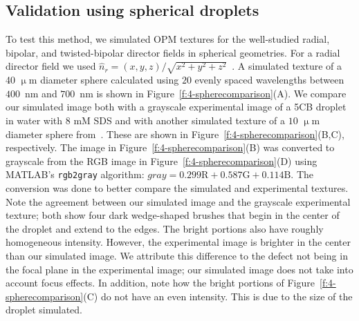 \subsection{Validation using spherical droplets}
To test this method, we simulated OPM textures for the well-studied radial, bipolar, and twisted-bipolar director fields in spherical geometries.
For a radial director field we used $\hat{n}_r = (x,y,z)/\sqrt{x^2+y^2+z^2}$~\cite{RN232}.
A simulated texture of a 40 $\upmu$m diameter sphere calculated using $20$ evenly spaced wavelengths between $400$~nm and $700$~nm is shown in Figure~\ref{f:4-spherecomparison}(A).
We compare our simulated image both with a grayscale experimental image of a 5CB droplet in water with 8 mM SDS and with another simulated texture of a $10$ $\upmu$m diameter sphere from~.
These are shown in Figure~\ref{f:4-spherecomparison}(B,C), respectively.
The image in Figure~\ref{f:4-spherecomparison}(B) was converted to grayscale from the RGB image in Figure~\ref{f:4-spherecomparison}(D) using MATLAB's \texttt{rgb2gray} algorithm: $gray = 0.299 \textrm{R} + 0.587 \textrm{G} + 0.114 \textrm{B}$.
The conversion was done to better compare the simulated and experimental textures.
Note the agreement between our simulated image and the grayscale experimental texture; both show four dark wedge-shaped brushes that begin in the center of the droplet and extend to the edges.
The bright portions also have roughly homogeneous intensity.
However, the experimental image is brighter in the center than our simulated image.
We attribute this difference to the defect not being in the focal plane in the experimental image; our simulated image does not take into account focus effects.
In addition, note how the bright portions of Figure~\ref{f:4-spherecomparison}(C) do not have an even intensity.
This is due to the size of the droplet simulated.


